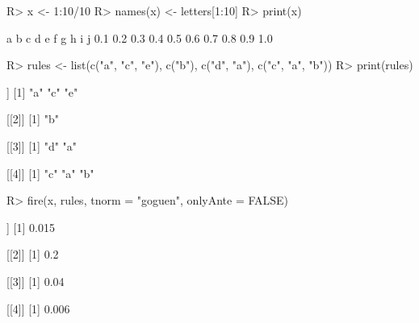 \begin{Schunk}
% --begin: "fire"
\begin{Sinput}
R> x <- 1:10/10
R> names(x) <- letters[1:10]
R> print(x)
\end{Sinput}
\begin{Soutput}
  a   b   c   d   e   f   g   h   i   j 
0.1 0.2 0.3 0.4 0.5 0.6 0.7 0.8 0.9 1.0 
\end{Soutput}
\begin{Sinput}
R> rules <- list(c("a", "c", "e"), c("b"), c("d", "a"), c("c", "a", "b"))
R> print(rules)
\end{Sinput}
\begin{Soutput}
[[1]]
[1] "a" "c" "e"

[[2]]
[1] "b"

[[3]]
[1] "d" "a"

[[4]]
[1] "c" "a" "b"
\end{Soutput}
\begin{Sinput}
R> fire(x, rules, tnorm = "goguen", onlyAnte = FALSE)
\end{Sinput}
\begin{Soutput}
[[1]]
[1] 0.015

[[2]]
[1] 0.2

[[3]]
[1] 0.04

[[4]]
[1] 0.006
\end{Soutput}
%
% --end: "fire"
\end{Schunk}
